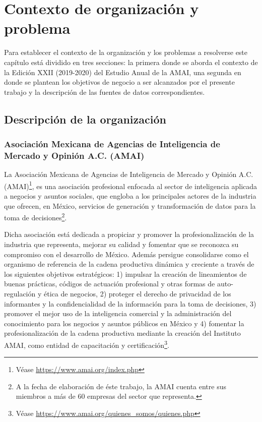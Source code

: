 \chapter{Contexto de organización y problema}

\noindent Para establecer el contexto de la organización y los problemas a resolverse este capítulo está dividido en tres secciones: la primera donde se aborda el contexto de la  Edición  XXII  (2019-2020) del Estudio Anual de la AMAI, una segunda en donde se plantean los objetivos de negocio a ser alcanzados por el presente trabajo y la descripción de las fuentes de datos correspondientes.

\section{Descripción de la organización }

\subsection{Asociación Mexicana de Agencias de Inteligencia de Mercado y Opinión A.C. (AMAI)}
La Asociación Mexicana de Agencias de Inteligencia de Mercado y Opinión A.C. (AMAI)\footnote{Véase \url{https://www.amai.org/index.php}}, es una asociación profesional enfocada al sector de inteligencia aplicada a negocios y asuntos sociales, que engloba a los principales actores de la industria que ofrecen, en México, servicios de generación y transformación de datos para la toma de decisiones\footnote{A la fecha de elaboración de éste trabajo, la AMAI cuenta entre sus miembros a más de 60 empresas del sector que representa.}.

Dicha asociación está dedicada a propiciar y promover la profesionalización de la industria que representa, mejorar su calidad y fomentar que se reconozca su compromiso con el desarrollo de México. Además persigue consolidarse como el organismo de referencia de la cadena productiva dinámica y creciente a través de los siguientes objetivos estratégicos: 1) impulsar la creación de lineamientos de buenas prácticas, códigos de actuación profesional y otras formas de auto-regulación y ética de negocios, 2) proteger el derecho de privacidad de los informantes y la confidencialidad de la información para la toma de decisiones, 3) promover el mejor uso de la inteligencia comercial y la administración del conocimiento para los negocios y asuntos públicos en México y 4) fomentar la profesionalización de la cadena productiva mediante la creación del Instituto AMAI, como entidad de capacitación y certificación\footnote{Véase \url{https://www.amai.org/quienes_somos/quienes.php}}.

